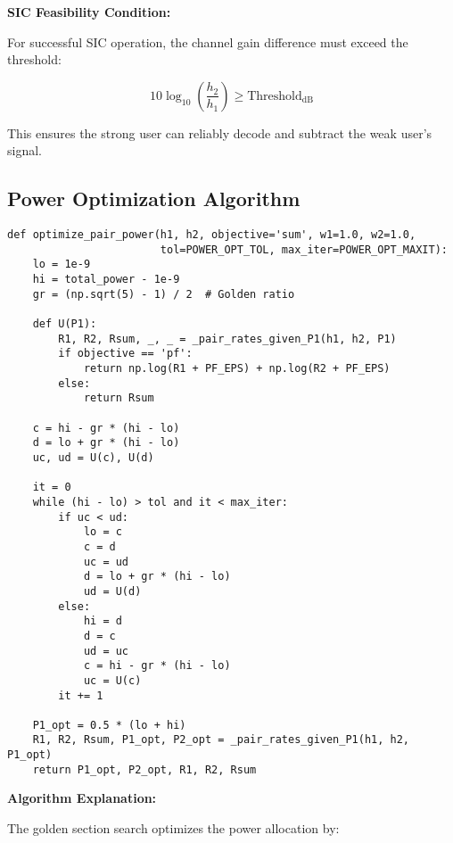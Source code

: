 \documentclass[11pt,a4paper]{article}
\begin{document}
\textbf{SIC Feasibility Condition:}

For successful SIC operation, the channel gain difference must exceed the threshold:

\begin{equation}
10 \log_{10}\left(\frac{h_2}{h_1}\right) \geq \text{Threshold}_{\text{dB}}
\end{equation}

This ensures the strong user can reliably decode and subtract the weak user's signal.

\subsection{Power Optimization Algorithm}

\begin{lstlisting}[caption={Golden Section Search Implementation}]
def optimize_pair_power(h1, h2, objective='sum', w1=1.0, w2=1.0,
                        tol=POWER_OPT_TOL, max_iter=POWER_OPT_MAXIT):
    lo = 1e-9
    hi = total_power - 1e-9
    gr = (np.sqrt(5) - 1) / 2  # Golden ratio

    def U(P1):
        R1, R2, Rsum, _, _ = _pair_rates_given_P1(h1, h2, P1)
        if objective == 'pf':
            return np.log(R1 + PF_EPS) + np.log(R2 + PF_EPS)
        else:
            return Rsum

    c = hi - gr * (hi - lo)
    d = lo + gr * (hi - lo)
    uc, ud = U(c), U(d)

    it = 0
    while (hi - lo) > tol and it < max_iter:
        if uc < ud:
            lo = c
            c = d
            uc = ud
            d = lo + gr * (hi - lo)
            ud = U(d)
        else:
            hi = d
            d = c
            ud = uc
            c = hi - gr * (hi - lo)
            uc = U(c)
        it += 1

    P1_opt = 0.5 * (lo + hi)
    R1, R2, Rsum, P1_opt, P2_opt = _pair_rates_given_P1(h1, h2, P1_opt)
    return P1_opt, P2_opt, R1, R2, Rsum
\end{lstlisting}

\textbf{Algorithm Explanation:}

The golden section search optimizes the power allocation by:
\end{document}
